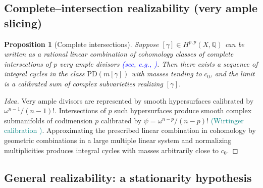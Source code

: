 \documentclass[11pt]{article}
\newcommand{\REV}[1]{\textcolor{blue}{#1}}
\newcommand{\REVMZ}[1]{\textcolor{teal}{#1}}  %
\numberwithin{equation}{section}  %
\theoremstyle{plain}
\newtheorem{proposition}[theorem]{Proposition}
\theoremstyle{definition}
\theoremstyle{remark}
\newcommand{\Q}{\mathbb{Q}}
\begin{document}
\subsection*{Complete--intersection realizability (very ample slicing)}

\begin{proposition}[Complete intersections]\label{prop:complete-intersection}
\label{thm:complete-intersection}
	Suppose $[\gamma]\in H^{p,p}(X,\Q)$ can be written as a rational linear
	combination of cohomology classes of complete intersections of $p$ very ample
	divisors\REV{ (see, e.g., \cite{Hartshorne77,Lazarsfeld04I,Lazarsfeld04II,Fulton98})}. Then there exists a sequence of integral cycles in the class
	$\mathrm{PD}(m[\gamma])$ with masses tending to $c_0$, and the limit is a calibrated
	sum of complex subvarieties realizing $[\gamma]$.
\end{proposition}


\begin{proof}[Idea]
	Very ample divisors are represented by smooth hypersurfaces \REVMZ{\cite{GH78,Hartshorne77}} calibrated by
	$\omega^{n-1}/(n-1)!$. Intersections of $p$ such hypersurfaces produce smooth
	complex submanifolds of codimension $p$ calibrated by $\psi=\omega^{n-p}/(n-p)!$ \REVMZ{(Wirtinger calibration \cite{HL82})}.
	Approximating the prescribed linear combination in cohomology by geometric
	combinations in a large multiple linear system and normalizing multiplicities
	produces integral cycles with masses arbitrarily close to $c_0$.
\end{proof}

\subsection*{General realizability: a stationarity hypothesis}
\end{document}
